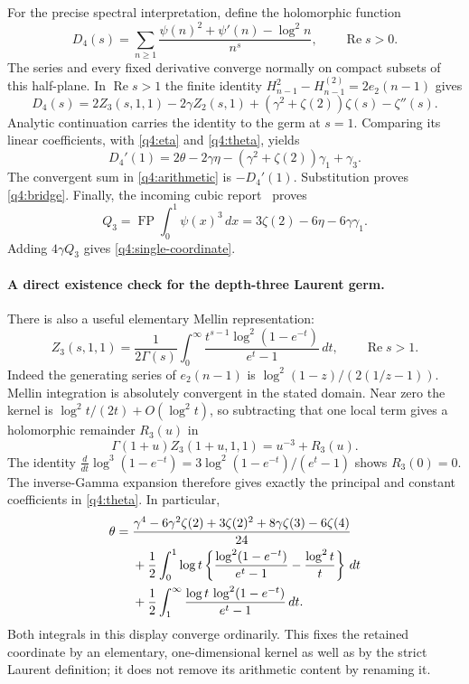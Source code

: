 For the precise spectral interpretation, define the holomorphic function
\[
 D_4(s)=\sum_{n\geq1}
       \frac{\psi(n)^2+\psi'(n)-\log^2n}{n^s},
       \qquad\operatorname{Re}s>0.
\]
The series and every fixed derivative converge normally on compact
subsets of this half-plane.  In $\operatorname{Re}s>1$ the finite identity
$H_{n-1}^2-H_{n-1}^{(2)}=2e_2(n-1)$ gives
\begin{equation}\label{q4:Didentity}
 D_4(s)=2Z_3(s,1,1)-2\gamma Z_2(s,1)
                  +(\gamma^2+\zeta(2))\zeta(s)-\zeta''(s).
\end{equation}
Analytic continuation carries the identity to the germ at $s=1$.
Comparing its linear coefficients, with \eqref{q4:eta} and
\eqref{q4:theta}, yields
\[
 D_4'(1)=2\theta-2\gamma\eta
                    -(\gamma^2+\zeta(2))\gamma_1+\gamma_3.
\]
The convergent sum in \eqref{q4:arithmetic} is $-D_4'(1)$.
Substitution proves \eqref{q4:bridge}.  Finally, the incoming cubic
report~\cite{IncomingCubic}
proves
\[
 Q_3=\operatorname{FP}\int_0^1\psi(x)^3\,dx
    =3\zeta(2)-6\eta-6\gamma\gamma_1.
\]
Adding $4\gamma Q_3$ gives \eqref{q4:single-coordinate}.

\paragraph{A direct existence check for the depth-three Laurent germ.}
There is also a useful elementary Mellin representation:
\begin{equation}\label{q4:heightone-mellin}
 Z_3(s,1,1)=\frac1{2\Gamma(s)}\int_0^\infty
     \frac{t^{s-1}\log^2(1-e^{-t})}{e^t-1}\,dt,
     \qquad\operatorname{Re}s>1.
\end{equation}
Indeed the generating series of $e_2(n-1)$ is
$\log^2(1-z)/(2(1/z-1))$.  Mellin integration is absolutely convergent
in the stated domain.  Near zero the kernel is
$\log^2t/(2t)+O(\log^2t)$, so subtracting that one local term gives
a holomorphic remainder $R_3(u)$ in
\[
 \Gamma(1+u)Z_3(1+u,1,1)=u^{-3}+R_3(u).
\]
The identity
$\frac{d}{dt}\log^3(1-e^{-t})=3\log^2(1-e^{-t})/(e^t-1)$
shows $R_3(0)=0$.  The inverse-Gamma expansion therefore gives exactly
the principal and constant coefficients in \eqref{q4:theta}.  In
particular,
\begin{align}\label{q4:theta-kernel}
 \theta={}&\frac{\gamma^4-6\gamma^2\zeta(2)+3\zeta(2)^2
                       +8\gamma\zeta(3)-6\zeta(4)}{24}\notag\\
 &+\frac12\int_0^1\log t
       \left\{\frac{\log^2(1-e^{-t})}{e^t-1}
                        -\frac{\log^2t}{t}\right\}\,dt\notag\\
 &+\frac12\int_1^\infty
       \frac{\log t\,\log^2(1-e^{-t})}{e^t-1}\,dt.
\end{align}
Both integrals in this display converge ordinarily.  This fixes the
retained coordinate by an elementary, one-dimensional kernel as well as
by the strict Laurent definition; it does not remove its arithmetic
content by renaming it.

